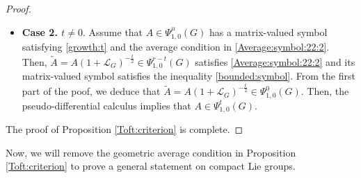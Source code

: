 \documentclass[12pt, reqno]{amsart}
\theoremstyle{definition}
\theoremstyle{remark}
\numberwithin{equation}{section}
\begin{document}
\begin{proof}
\begin{itemize}
\begin{align*}
    \end{align*}Our induction hypothesis implies that $\tilde{A}$ belongs to the class $\Psi^0_{1,0}(G).$ But then, the Calder\'on-Vaillancourt theorem implies that $\tilde A$ is bounded on $L^2(G).$ Since on the co-sphere $T^*\mathbb{S}(G)$ the principal symbols of $\tilde A$ and of $A$ agree, $\tilde A$ satisfies the average condition \eqref{Average:symbol:22:2}.  Then, Proposition \ref{Invariance:trace:2} implies that $\mu_0\leq 0.$ Since
    $$ A(1+\mathcal{L}_G)^{-\frac{1}{2}}\in \Psi^{\mu_0}_{1,0}(G)\subseteq \Psi^{0}_{1,0}(G), $$ then $$ A\in \Psi^{\mu_0+1}_{1,0}(G)\subseteq \Psi^{1}_{1,0}(G), $$
    and together with the hypothesis \eqref{bounded:symbol} we can use the base case $\mu=1$ in the inductive process to establish that $A\in \Psi^0_{1,0}(G).$ So, by the mathematical induction we have proved the statement in Theorem \ref{Toft:criterion} in the case where $\mu\in \mathbb{N}.$ Now, in the general case  if $[\mu]$ is the integer part of every $\mu>0,$ and if $A\in \Psi^{\mu}_{1,0}(G)$ is a classical pseudo-differential operator satisfying \eqref{bounded:symbol}, we have that $A\in \Psi^{[\mu]+1}_{1,0}(G)$ and then the better conclusion $A\in \Psi^{0}(G)$ follows from the statement of Theorem \ref{Toft:criterion}  for integer orders. Thus, we have proved Theorem \ref{Toft:criterion} in the case $t=0.$
\item {\bf Case 2. $t\neq 0.$} Assume that $A\in \Psi^{\mu}_{1,0}(G)$ has a matrix-valued symbol satisfying \eqref{growth:t} and the average condition in \eqref{Average:symbol:22:2}. Then, $\tilde{A}=A(1+\mathcal{L}_G)^{-\frac{t}{2}}\in \Psi^{r-t}_{1,0}(G)$ satisfies \eqref{Average:symbol:22:2} and its matrix-valued symbol satisfies the inequality \eqref{bounded:symbol}. From the first part of the poof, we deduce that $\tilde{A}=A(1+\mathcal{L}_G)^{-\frac{t}{2}}\in \Psi^{0}_{1,0}(G).$ Then, the pseudo-differential calculus implies that $A\in \Psi^{t}_{1,0}(G).$
 \end{itemize}
 The proof of Proposition \ref{Toft:criterion} is complete.  
\end{proof}
 Now, we will remove the geometric average condition in  Proposition \ref{Toft:criterion} to prove a general statement on compact Lie groups.
\end{document}
